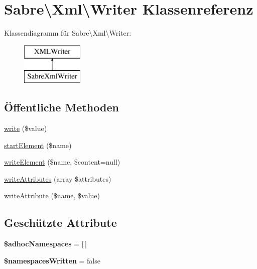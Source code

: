 \hypertarget{class_sabre_1_1_xml_1_1_writer}{}\section{Sabre\textbackslash{}Xml\textbackslash{}Writer Klassenreferenz}
\label{class_sabre_1_1_xml_1_1_writer}
Klassendiagramm für Sabre\textbackslash{}Xml\textbackslash{}Writer\+:\begin{figure}[H]
\begin{center}
\leavevmode
\includegraphics[height=2.000000cm]{class_sabre_1_1_xml_1_1_writer}
\end{center}
\end{figure}
\subsection*{Öffentliche Methoden}
\begin{DoxyCompactItemize}
\item 
\mbox{\hyperlink{class_sabre_1_1_xml_1_1_writer_a7ae8afe73ac4ca8d34a609b6ac16da5e}{write}} (\$value)
\item 
\mbox{\hyperlink{class_sabre_1_1_xml_1_1_writer_a36f607e50b1cfff7637bbeeb63093400}{start\+Element}} (\$name)
\item 
\mbox{\hyperlink{class_sabre_1_1_xml_1_1_writer_a251d9cb147ab5a8cd53453dee8915334}{write\+Element}} (\$name, \$content=null)
\item 
\mbox{\hyperlink{class_sabre_1_1_xml_1_1_writer_a7af042e7d29fe5c49a42ee4e9c7a33db}{write\+Attributes}} (array \$attributes)
\item 
\mbox{\hyperlink{class_sabre_1_1_xml_1_1_writer_a1bd8ec6a35705bf1b001d453049c8336}{write\+Attribute}} (\$name, \$value)
\end{DoxyCompactItemize}
\subsection*{Geschützte Attribute}
\begin{DoxyCompactItemize}
\item 
\mbox{\label{class_sabre_1_1_xml_1_1_writer_a614d39a2b894c36e679cb164a8689cdf}} 
{\bfseries \$adhoc\+Namespaces} = \mbox{[}$\,$\mbox{]}
\item 
\mbox{\label{class_sabre_1_1_xml_1_1_writer_a11a8a03f0212d4502992f3ae56fd7c65}} 
{\bfseries \$namespaces\+Written} = false
\end{DoxyCompactItemize}


